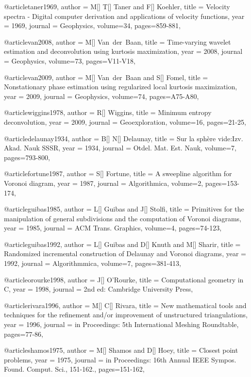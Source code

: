 {@article{taner1969,
  author =	 {M[] T[] Taner and F[] Koehler},
  title =	 {Velocity spectra - Digital computer derivation and applications of velocity functions},
  year =	 1969,
  journal =	 {Geophysics},
  volume={34},
 pages=859-881,
}

@article{van2008,
  author =	 {M[] Van~der~Baan},
  title =	 {Time-varying wavelet estimation and deconvolution using kurtosis maximization},
  year =	 2008,
  journal =	 {Geophysics},
  volume={73},
 pages=V11-V18,
}

@article{van2009,
  author =	 {M[] Van~der~Baan and S[] Fomel},
  title =	 {Nonstationary phase estimation using regularized local kurtosis maximization},
  year =	 2009,
  journal =	 {Geophysics},
  volume={74},
 pages=A75-A80,
}

@article{wiggins1978,
  author =	 {R[] Wiggins},
  title =	 {Minimum entropy deconvolution},
  year =	 2009,
  journal =	 {Geoexploration},
  volume={16},
 pages=21-25,
}

@article{delaunay1934,
  author =	 {B[] N[] Delaunay},
  title =	 {Sur la sph\`{e}re vide:Izv. Akad. Nauk SSSR},
  year =	 1934,
  journal =	 {Otdel. Mat. Est. Nauk},
  volume={7},
 pages=793-800,
}

@article{fortune1987,
  author =	 {S[] Fortune},
  title =	 {A sweepline algorithm for Voronoi diagram},
  year =	 1987,
  journal =	 {Algorithmica},
  volume={2},
 pages=153-174,
}

@article{guibas1985,
  author =	 {L[] Guibas and J[] Stolfi},
  title =	 {Primitives for the manipulation of general subdivisions and the computation of Voronoi diagrams},
  year =	 1985,
  journal =	 {ACM Trans. Graphics},
  volume={4},
 pages=74-123,
}

@article{guibas1992,
  author =	 {L[] Guibas and D[] Knuth and M[] Sharir},
  title =	 {Randomized incremental construction of Delaunay and Voronoi diagrams},
  year =	 1992,
  journal =	 {Algorithmmica},
  volume={7},
 pages=381-413,
}

@article{orourke1998,
  author =	 {J[] O'Rourke},
  title =	 {Computational geometry in C},
  year =	 1998,
  journal =	 {2nd ed: Cambridge University Press},
}

@article{rivara1996,
  author =	 {M[] C[] Rivara},
  title =	 {New mathematical tools and techniques for the refinement and/or improvement of unstructured triangulations},
  year =	 1996,
  journal =	 {in Proceedings: 5th International Meshing Roundtable},
 pages=77-86,
}

@article{shamos1975,
  author =	 {M[] Shamos and D[] Hoey},
  title =	 {Closest point problems},
  year =	 1975,
  journal =	 {in Proceedings: 16th Annual IEEE Sympos. Found. Comput. Sci., 151-162.},
  pages=151-162,
}

}
